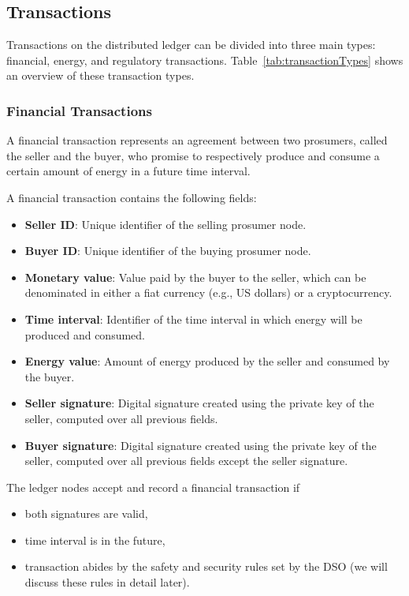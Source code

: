 \documentclass[chi_draft]{sigchi}
\begin{document}
\subsection{Transactions}

Transactions on the distributed ledger can be divided into three main types: financial, energy, and regulatory transactions.
Table~\ref{tab:transactionTypes} shows an overview of these transaction types.

\subsubsection{Financial Transactions}
A financial transaction represents an agreement between two prosumers, called the seller and the buyer, who promise to respectively produce and consume a certain amount of energy in a future time interval.

A financial transaction contains the following fields:
\begin{itemize}
\item \textbf{Seller ID}: Unique identifier of the selling prosumer node.
\item \textbf{Buyer ID}: Unique identifier of the buying prosumer node.
\item \textbf{Monetary value}: Value paid by the buyer to the seller, which can be denominated in either a fiat currency (e.g., US dollars) or a cryptocurrency.
\item \textbf{Time interval}: Identifier of the time interval in which energy will be produced and consumed.
\item \textbf{Energy value}: Amount of energy produced by the seller and consumed by the buyer.
\item \textbf{Seller signature}: Digital signature created using the private key of the seller, computed over all previous fields.
\item \textbf{Buyer signature}: Digital signature created using the private key of the seller, computed over all previous fields except the seller signature.
\end{itemize}

The ledger nodes accept and record a financial transaction if
\begin{itemize}
\item both signatures are valid,
\item time interval is in the future,
\item transaction abides by the safety and security rules set by the DSO (we will discuss these rules in detail later).
\end{itemize}
\end{document}
